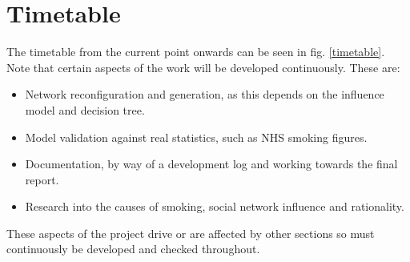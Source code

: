 \documentclass[]{article}
\begin{document}
\section{Timetable}
The timetable from the current point onwards can be seen in fig. \ref{timetable}. Note that certain aspects of the work will
be developed continuously. These are:
\begin{itemize}
\item Network reconfiguration and generation, as this depends on the influence model and decision tree.
\item Model validation against real statistics, such as NHS smoking figures.
\item Documentation, by way of a development log and working towards the final report.
\item Research into the causes of smoking, social network influence and rationality.
\end{itemize}
These aspects of the project drive or are affected by other sections so must continuously be developed and checked throughout.
\end{document}
